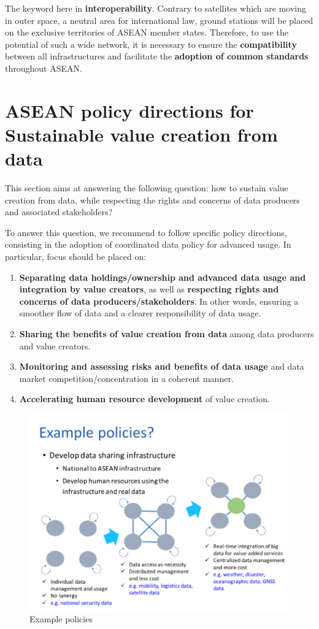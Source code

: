 The keyword here in \textbf{interoperability}. Contrary to satellites which are moving in outer space, a neutral area for international law, ground stations will be placed on the exclusive territories of ASEAN member states. Therefore, to use the potential of such a wide network, it is necessary to ensure the \textbf{compatibility} between all infrastructures and facilitate the \textbf{adoption of common standards} throughout ASEAN.


\section{ASEAN policy directions for Sustainable value creation from data} \label{data_util}

\tab This section aims at answering the following question: how to sustain value creation from data, while respecting the rights and concerns of data producers and associated stakeholders?

\vspace{0.4 cm}

To answer this question, we recommend to follow specific policy directions, consisting in the adoption of coordinated data policy for advanced usage. In particular, focus should be placed on:

\begin{enumerate}

\item \textbf{Separating data holdings/ownership and advanced data usage and integration by value creators}, as well as \textbf{respecting rights and concerns of data producers/stakeholders}. In other words, ensuring a smoother flow of data and a clearer responsibility of data usage.

\item \textbf{Sharing the benefits of value creation from data} among data producers and value creators.

\item \textbf{Monitoring and assessing risks and benefits of data usage} and data market competition/concentration in a coherent manner.

\item \textbf{Accelerating human resource development} of value creation.

\end{enumerate}


\begin{figure}[H]
\begin{center}
\includegraphics[width = 0.8\linewidth]{Figures/example_policies.png}
\end{center}
\caption{Example policies}
\label{example_policies}
\end{figure}



